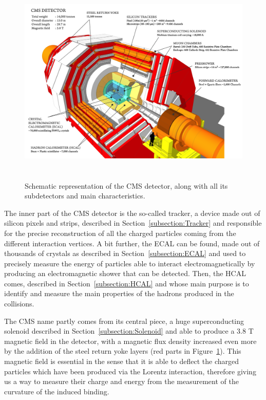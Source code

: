 \documentclass[a4paper, 10pt, openright]{report}
\begin{document}
\begin{figure}[htbp]
\begin{center}
\includegraphics[width=15cm, height=10cm]{figs/CMS.png}
\caption{Schematic representation of the \ac{CMS} detector, along with all its subdetectors and main characteristics.}
\label{fig:CMS}
\end{center}
\end{figure}

The inner part of the \ac{CMS} detector is the so-called tracker, a device made out of silicon pixels and strips, described in Section~\ref{subsection:Tracker} and responsible for the precise reconstruction of all the charged particles coming from the different interaction vertices. A bit further, the \acf{ECAL} can be found, made out of thousands of crystals as described in Section~\ref{subsection:ECAL} and used to precisely measure the energy of particles able to interact electromagnetically by producing an electromagnetic shower that can be detected. Then, the \acf{HCAL} comes, described in Section~\ref{subsection:HCAL} and whose main purpose is to identify and measure the main properties of the hadrons produced in the collisions.

The \ac{CMS} name partly comes from its central piece, a huge superconducting solenoid described in Section~\ref{subsection:Solenoid} and able to produce a 3.8 T magnetic field in the detector, with a magnetic flux density increased even more by the addition of the steel return yoke layers (red parts in Figure~\ref{fig:CMS}). This magnetic field is essential in the sense that it is able to deflect the charged particles which have been produced via the Lorentz interaction, therefore giving us a way to measure their charge and energy from the measurement of the curvature of the induced binding.
\end{document}
